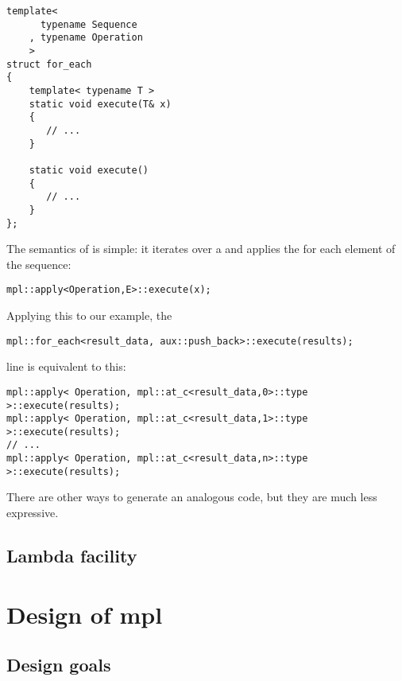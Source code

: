 \documentclass{kapproc}
\begin{document}
{\small
\begin{codesamp}\begin{verbatim}
template<
      typename Sequence
    , typename Operation
    >
struct for_each
{
    template< typename T >
    static void execute(T& x)
    {
       // ...
    }

    static void execute()
    {
       // ...
    }
};
\end{verbatim}
\end{codesamp}
}

The semantics of  is simple: it 
iterates over a  and applies the 
for each element  of the sequence:

{\small
\begin{codesamp}\begin{verbatim}
mpl::apply<Operation,E>::execute(x);
\end{verbatim}
\end{codesamp}
}

Applying this to our example, the 

{\small
\begin{codesamp}\begin{verbatim}
mpl::for_each<result_data, aux::push_back>::execute(results);
\end{verbatim}
\end{codesamp}
}

line is equivalent to this:

{\small
\begin{codesamp}\begin{verbatim}
mpl::apply< Operation, mpl::at_c<result_data,0>::type >::execute(results);
mpl::apply< Operation, mpl::at_c<result_data,1>::type >::execute(results);
// ...
mpl::apply< Operation, mpl::at_c<result_data,n>::type >::execute(results);
\end{verbatim}
\end{codesamp}
}

There are other ways to generate an analogous code, 
but they are much less expressive.


\subsection{Lambda facility}

\section{Design of mpl}
\subsection{Design goals}
\end{document}
